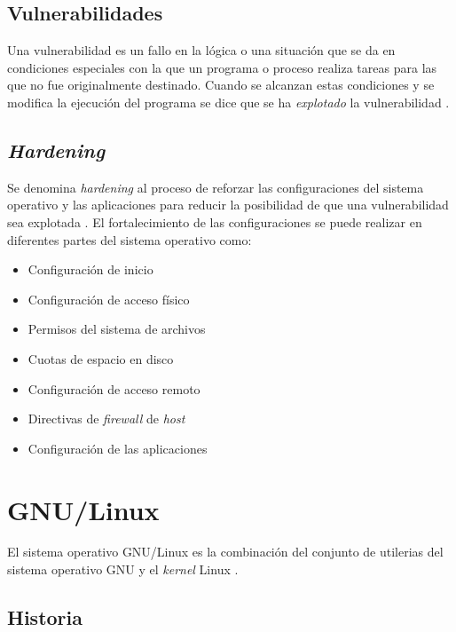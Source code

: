   \subsection {Vulnerabilidades}

Una vulnerabilidad es un fallo en la l\'{o}gica o una situaci\'{o}n que se da en condiciones especiales con la que un programa o proceso realiza tareas para las que no fue originalmente destinado. Cuando se alcanzan estas condiciones y se modifica la ejecuci\'{o}n del programa se dice que se ha \textit{explotado} la vulnerabilidad \cite{padilla_buenas_2009}.

  \subsection {\textit{Hardening}}

Se denomina \textit{hardening} al proceso de reforzar las configuraciones del sistema operativo y las aplicaciones para reducir la posibilidad de que una vulnerabilidad sea explotada \cite{padilla_buenas_2009}. El fortalecimiento de las configuraciones se puede realizar en diferentes partes del sistema operativo como:

\begin{itemize}
  \item Configuraci\'{o}n de inicio
  \item Configuraci\'{o}n de acceso f\'{i}sico
  \item Permisos del sistema de archivos
  \item Cuotas de espacio en disco
  \item Configuraci\'{o}n de acceso remoto
  \item Directivas de \textit{firewall} de \textit{host}
  \item Configuraci\'{o}n de las aplicaciones
\end{itemize}

\newpage
\section {\textsc{GNU}/Linux}

El sistema operativo GNU/Linux es la combinaci\'{o}n del conjunto de utilerias del sistema operativo GNU y el \textit{kernel} Linux \cite{_linux_????}.


  \subsection {Historia}

